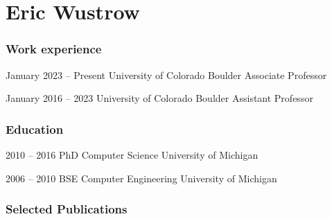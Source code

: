 \documentclass{tccv}
\begin{document}
\part{Eric Wustrow}

\section{Work experience}

\begin{eventlist}

\item{January 2023 -- Present}
     {University of Colorado Boulder}
     {Associate Professor}

\item{January 2016 -- 2023}
     {University of Colorado Boulder}
     {Assistant Professor}


\end{eventlist}

\section{Education}

\begin{yearlist}

\item[]{2010 -- 2016}
     {PhD Computer Science}
     {University of Michigan}

\item[]{2006 -- 2010}
    {BSE Computer Engineering}
    {University of Michigan}

\end{yearlist}

\medskip

\section{Selected Publications}
\end{document}
